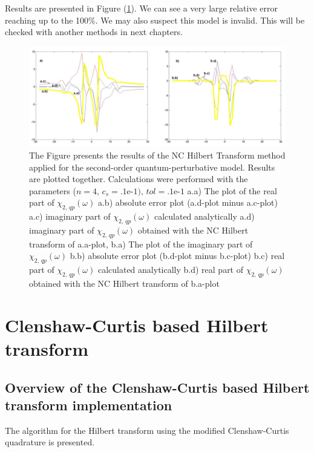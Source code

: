 \documentclass[12pt,twoside,a4paper]{article}
\numberwithin{equation}{subsection}
\numberwithin{figure}{subsection}
\begin{document}
Results are presented in Figure (\ref{fig:nc_quantum2}). We can see a very large relative error reaching up to the 100\%. We may also suspect this model is invalid. This will be checked with another methods in next chapters.

\begin{figure} 
  \includegraphics[width=150mm]{img/nc_quantum2.png}
  \caption{The Figure presents the results of the NC Hilbert Transform method applied for the second-order quantum-perturbative model. Results are plotted together. Calculations were performed with the parameters ($n = 4, \, c_s = \mbox{.1e-1}), \,tol=\mbox{.1e-1}$ a.a) The plot of the real part of ${\chi_{2, \,qp}}(\omega )$
     a.b) absolute error plot (a.d-plot minus a.c-plot) 
     a.c) imaginary part of ${\chi_{2, \,qp}}(\omega )$ calculated analytically 
     a.d) imaginary part of ${\chi_{2, \,qp}}(\omega )$ obtained with the NC Hilbert transform of a.a-plot, 
     b.a) The plot of the imaginary part of ${\chi_{2, \,qp}}(\omega )$ 
     b.b) absolute error plot (b.d-plot minus b.c-plot) 
     b.c) real part of $\chi_{2, \, qp} (\omega )$ calculated analytically 
     b.d) real part of $\chi_{2, \, qp} (\omega )$ obtained with the NC Hilbert transform of b.a-plot 
     \label{fig:nc_quantum2}
     }
\end{figure}
 
\section{Clenshaw-Curtis based Hilbert transform} \label{chap:hcc}

\subsection{Overview of the Clenshaw-Curtis based Hilbert transform implementation} \label{chap:hcc_overview}

The algorithm for the Hilbert transform using the modified Clenshaw-Curtis quadrature is presented. 
\end{document}
